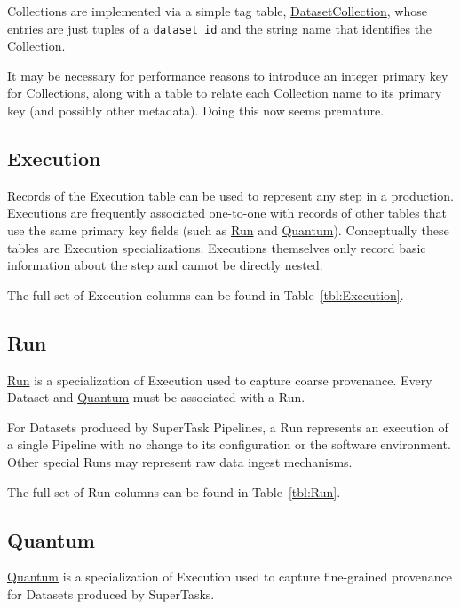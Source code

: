 \documentclass[DM,toc]{lsstdoc}
\newcommand{\tblref}[1]{\hyperref[tbl:#1]{#1}}
\newcommand{\coltable}[1]{
    \begin{table}[htb]
        {
            \footnotesize
            
        }
        \caption{#1 Columns}
        \label{tbl:#1}
    \end{table}
}
\begin{document}
Collections are implemented via a simple tag table, \tblref{DatasetCollection}, whose entries are just tuples of a \texttt{dataset\_id} and the string name that identifies the Collection.

It may be necessary for performance reasons to introduce an integer primary key for Collections, along with a table to relate each Collection name to its primary key (and possibly other metadata).
Doing this now seems premature.

\coltable{DatasetCollection}

\subsection{Execution}
\label{sec:excution}

Records of the \tblref{Execution} table can be used to represent any step in a production.
Executions are frequently associated one-to-one with records of other tables that use the same primary key fields (such as \hyperref[sec:run]{Run} and \hyperref[sec:quantum]{Quantum}).
Conceptually these tables are Execution specializations.
Executions themselves only record basic information about the step and cannot be directly nested.

The full set of Execution columns can be found in Table~\ref{tbl:Execution}.

\coltable{Execution}

\subsection{Run}
\label{sec:run}

\tblref{Run} is a specialization of Execution used to capture coarse provenance.
Every Dataset and \hyperref[sec:quantum]{Quantum} must be associated with a Run.

For Datasets produced by SuperTask Pipelines, a Run represents an execution of a single Pipeline with no change to its configuration or the software environment.
Other special Runs may represent raw data ingest mechanisms.

The full set of Run columns can be found in Table~\ref{tbl:Run}.

\coltable{Run}

\subsection{Quantum}
\label{sec:quantum}

\tblref{Quantum} is a specialization of Execution used to capture fine-grained provenance for Datasets produced by SuperTasks.
\end{document}
